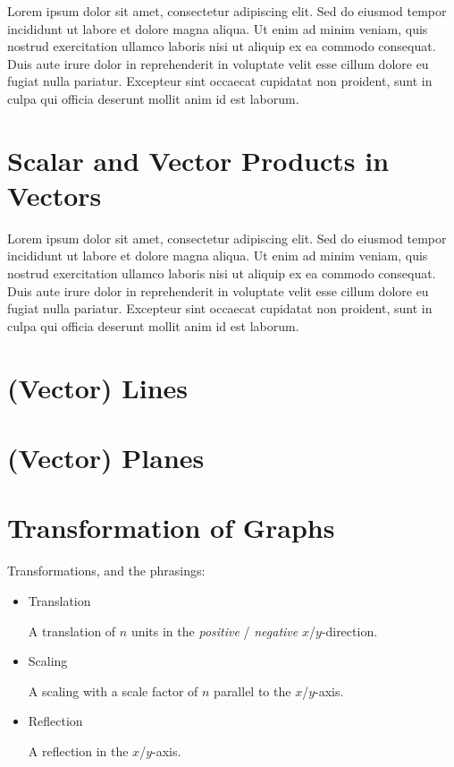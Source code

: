 \documentclass[a4paper]{article}
\begin{document}
Lorem ipsum dolor sit amet, consectetur adipiscing elit. Sed do eiusmod tempor
incididunt ut labore et dolore magna aliqua. Ut enim ad minim veniam, quis
nostrud exercitation ullamco laboris nisi ut aliquip ex ea commodo consequat.
Duis aute irure dolor in reprehenderit in voluptate velit esse cillum dolore eu
fugiat nulla pariatur. Excepteur sint occaecat cupidatat non proident, sunt in
culpa qui officia deserunt mollit anim id est laborum.

\renewcommand{\thesection}{2B}
\section{Scalar and Vector Products in Vectors}

Lorem ipsum dolor sit amet, consectetur adipiscing elit. Sed do eiusmod tempor
incididunt ut labore et dolore magna aliqua. Ut enim ad minim veniam, quis
nostrud exercitation ullamco laboris nisi ut aliquip ex ea commodo consequat.
Duis aute irure dolor in reprehenderit in voluptate velit esse cillum dolore eu
fugiat nulla pariatur. Excepteur sint occaecat cupidatat non proident, sunt in
culpa qui officia deserunt mollit anim id est laborum.

\renewcommand{\thesection}{2C}
\section{(Vector) Lines}

\renewcommand{\thesection}{2D}
\section{(Vector) Planes}

\renewcommand{\thesection}{\arabic{section}}
\setcounter{section}{2}

\section{Transformation of Graphs}

Transformations, and the phrasings:
\begin{itemize}
	\item Translation
	
	A translation of $n$ units in the \emph{positive} / \emph{negative} $x$/$y$-direction.
	\item Scaling
	
	A scaling with a scale factor of $n$ parallel to the $x$/$y$-axis.
	\item Reflection
	
	A reflection in the $x$/$y$-axis.
\end{itemize}
\end{document}

